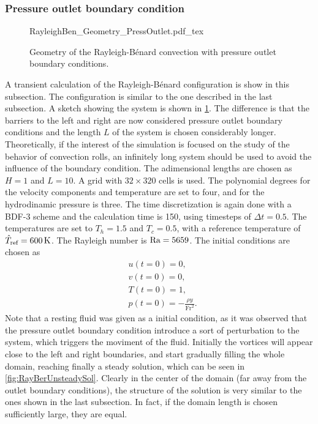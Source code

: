 \subsubsection{Pressure outlet boundary condition}\label{ssec:MultipleCellConv}
\begin{figure}[t!]
	\begin{center}
		\def\svgwidth{0.93\textwidth}
		{RayleighBen_Geometry_PressOutlet.pdf_tex}
		\caption{Geometry of the Rayleigh-Bénard convection with pressure outlet boundary conditions. }
		\label{fig:RayBenGeometry}
	\end{center}
\end{figure}
A transient calculation of the Rayleigh-Bénard configuration is show in this subsection. The configuration is similar to the one described in the last subsection. A sketch showing the system is shown in \cref{fig:RayBenGeometry}. The difference is that the barriers to the left and right are now considered pressure outlet boundary conditions and the length $L$ of the system is chosen considerably longer. Theoretically, if the interest of the simulation is focused on the study of the behavior of convection rolls, an infinitely long system should be used to avoid the influence of the boundary condition. The adimensional lengths are chosen as $H=1$ and $L=10$. A grid with $32\times320$ cells is used. The polynomial degrees for the velocity components and temperature are set to four, and for the hydrodinamic pressure is three. The time discretization is again done with a BDF-3 scheme and the calculation time is 150, using timesteps of $\Delta t = 0.5$. The temperatures are set to $T_h = 1.5$ and $T_c = 0.5$, with a reference temperature of $\hat T_{\text{ref}} = \SI{600}{\kelvin}$. The Rayleigh number is $\text{Ra} = 5659$. The initial conditions are chosen as
\begin{subequations} 
	\begin{align}
		&u(t=0) = 0, \\
		&v(t=0) = 0, \\
		&T(t=0) = 1, \\
		&p(t=0) = -\frac{\rho y}{\text{Fr}^2}.
	\end{align}
\end{subequations}
Note that a resting fluid was given as a initial condition, as it was observed that the pressure outlet boundary condition introduce a sort of perturbation to the system, which triggers the moviment of the fluid. Initially the vortices will appear close to the left and right boundaries, and start gradually filling the whole domain, reaching finally a steady solution, which can be seen in \cref{fig:RayBerUnsteadySol}. Clearly in the center of the domain (far away from the outlet boundary conditions), the structure of the solution is very similar to the ones shown in the last subsection. In fact, if the domain length is chosen sufficiently large, they are equal. 





